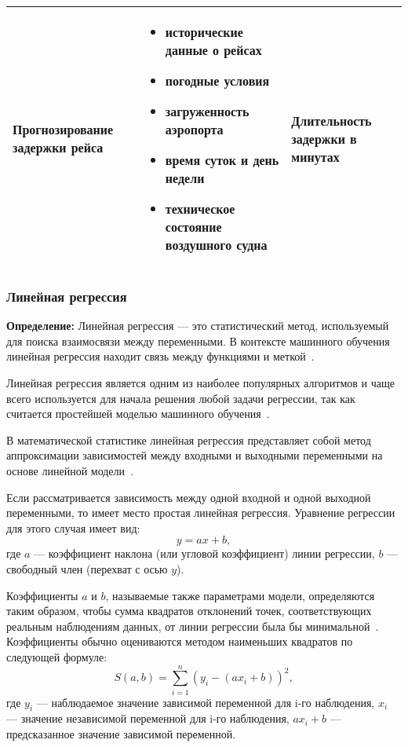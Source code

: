 \begin{table}[H]
\begin{tabularx}{\textwidth}{|>{\centering\arraybackslash}X|>{\centering\arraybackslash}X|>{\centering\arraybackslash}X|}
        \hline
        Прогнозирование задержки рейса &
        \begin{itemize}[label=---,leftmargin=*,nosep]
            \item исторические данные о рейсах
            \item погодные условия
            \item загруженность аэропорта
            \item время суток и день недели
            \item техническое состояние воздушного судна
        \end{itemize} &
        Длительность задержки в минутах \\
        \hline
    \end{tabularx}
    \label{tab:tabl1}
\end{table}

\subsubsection{Линейная регрессия}

\textbf{ Определение:} Линейная регрессия --- это статистический метод, используемый для поиска взаимосвязи между переменными.
В контексте машинного обучения линейная регрессия находит связь между функциями и меткой~\cite{google}.

Линейная регрессия является одним из наиболее популярных алгоритмов и чаще всего используется для начала решения любой задачи регрессии, так как считается простейшей моделью машинного обучения~\cite{kemer}.

В математической статистике линейная регрессия представляет собой метод аппроксимации зависимостей между входными и выходными переменными на основе линейной модели~\cite{loginom}.

Если рассматривается зависимость между одной входной и одной выходной переменными, то имеет место простая линейная регрессия.
Уравнение регрессии для этого случая имеет вид:
\begin{equation}
    y = ax + b,
\end{equation}
где $a$ --- коэффициент наклона (или угловой коэффициент) линии регрессии, $b$ --- свободный член (перехват с осью $y$).

Коэффициенты $a$ и $b$, называемые также параметрами модели, определяются таким образом, чтобы сумма квадратов отклонений точек, соответствующих реальным наблюдениям данных, от линии регрессии была бы минимальной~\cite{loginom}.
Коэффициенты обычно оцениваются методом наименьших квадратов по следующей формуле:
\begin{equation}
   S(a, b) = \sum_{i=1}^{n}(y_i - (ax_i + b))^2,
\end{equation}
где $y_i$ --- наблюдаемое значение зависимой переменной для i-го наблюдения, $x_i$ --- значение независимой переменной для i-го наблюдения, $ax_i + b$ --- предсказанное значение зависимой переменной.

